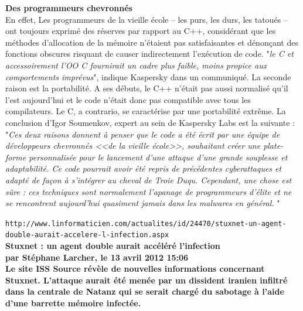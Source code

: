 \documentclass[11pt,twoside,a4paper]{article}
\begin{document}
\textbf{\large Des programmeurs chevronn{\'e}s}~\\

En effet, Les programmeurs de la vieille {\'e}cole -- les purs, les durs, les tatou{\'e}s -- ont toujours exprim{\'e} des r{\'e}serves par rapport au C++, consid{\'e}rant que les m{\'e}thodes d'allocation de la m{\'e}moire n'{\'e}taient pas satisfaisantes et d{\'e}non\c{c}ant des fonctions obscures risquant de causer indirectement l'ex{\'e}cution de code. "\emph{le C et accessoirement l'OO C fournirait un cadre plus faible, moins propice aux comportements impr{\'e}vus}", indique Kaspersky dans un communiqu{\'e}. La seconde raison est la portabilit{\'e}. A ses d{\'e}buts, le C++ n'{\'e}tait pas aussi normalis{\'e} qu'il l'est aujourd'hui et le code n'{\'e}tait donc pas compatible avec tous les compilateurs. Le C, a contrario, se caract{\'e}rise par une portabilit{\'e} extr{\^e}me. La conclusion d'Igor Soumenkov, expert au sein de Kaspersky Labs est la suivante :~\\
"\emph{Ces deux raisons donnent {\`a} penser que le code a {\'e}t{\'e} {\'e}crit par une {\'e}quipe de d{\'e}veloppeurs chevronn{\'e}s <<de la vieille {\'e}cole>>, souhaitant cr{\'e}er une plate-forme personnalis{\'e}e pour le lancement d'une attaque d'une grande souplesse et adaptabilit{\'e}. Ce code pourrait avoir {\'e}t{\'e} repris de pr{\'e}c{\'e}dentes cyberattaques et adapt{\'e} de fa\c{c}on {\`a} s'int{\'e}grer au cheval de Troie Duqu. Cependant, une chose est s{\^u}re : ces techniques sont normalement l'apanage de programmeurs d'{\'e}lite et ne se rencontrent aujourd'hui quasiment jamais dans les malwares en g{\'e}n{\'e}ral. } " %

\clearpage

\texttt{http://www.linformaticien.com/actualites/id/24470/stuxnet-un-agent-double-aurait-accelere-l-infection.aspx}~\\

\textbf{\LARGE Stuxnet : un agent double aurait acc{\'e}l{\'e}r{\'e} l'infection}~\\

\textbf{\small par St{\'e}phane Larcher, le 13 avril 2012 15:06}~\\

\textbf{Le site ISS Source r{\'e}v{\`e}le de nouvelles informations concernant Stuxnet. L'attaque aurait {\'e}t{\'e} men{\'e}e par un dissident iranien infiltr{\'e} dans la centrale de Natanz qui se serait charg{\'e} du sabotage {\`a} l'aide d'une barrette m{\'e}moire infect{\'e}e.}~\\
\end{document}
